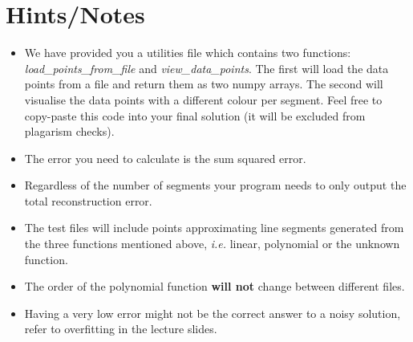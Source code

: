 \documentclass[12pt]{article}
\begin{document}
\section{Hints/Notes}
\label{sec:hints/notes}
\begin{itemize}
    \item We have provided you a utilities file which contains two functions: \textit{load\_points\_from\_file} and \textit{view\_data\_points}.
        The first will load the data points from a file and return them as two numpy arrays.
        The second will visualise the data points with a different colour per segment.
        Feel free to copy-paste this code into your final solution (it will be excluded from plagarism checks).
    \item The error you need to calculate is the sum squared error. 
    \item Regardless of the number of segments your program needs to only output the total reconstruction error. 
    \item The test files will include points approximating line segments generated from the three functions mentioned above, \textit{i.e.} linear, polynomial or the unknown function. 
    \item The order of the polynomial function \textbf{will not} change between different files.
    \item Having a very low error might not be the correct answer to a noisy solution, refer to overfitting in the lecture slides. 
\end{itemize}
\end{document}
